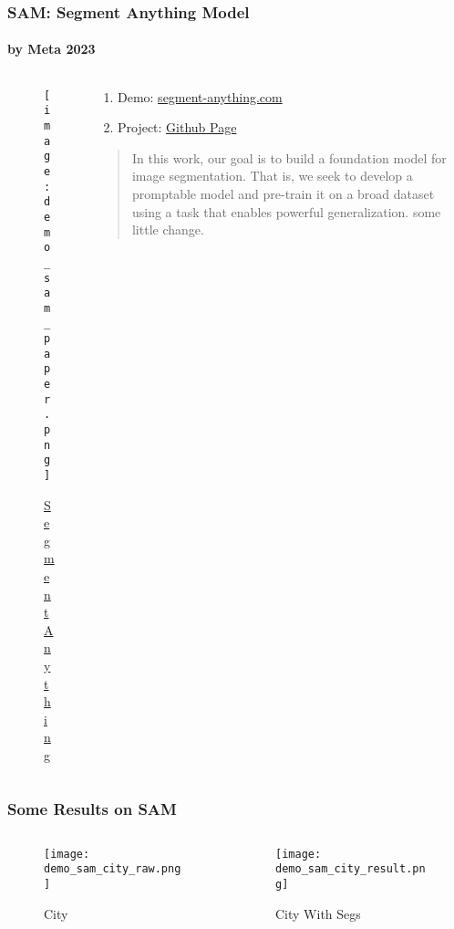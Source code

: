 \begin{frame}
    \frametitle{SAM: Segment Anything Model}
    \framesubtitle{by Meta 2023}
    \begin{columns}[c] %
        \begin{column}{0.3\textwidth} %
            \begin{figure}
                \texttt{[image: demo\_sam\_paper.png]}
                \caption{\href{https://arxiv.org/abs/2304.02643}{Segment Anything}}
            \end{figure}
        \end{column}
        \begin{column}{0.68\textwidth} %
            \begin{enumerate}
                \item Demo: \href{https://segment-anything.com/demo}{segment-anything.com}
                \item Project: \href{https://github.com/facebookresearch/segment-anything}{Github Page}
            \end{enumerate}
            \begin{quote}
                In this work, our goal is to build a foundation model for image segmentation. That is, we seek to develop a promptable model and pre-train
                it on a broad dataset using a task that enables powerful generalization. some little change.
            \end{quote}
        \end{column}
    \end{columns}
\end{frame}


\begin{frame}
    \frametitle{Some Results on SAM}
    \begin{columns}[c] %
        \begin{column}{0.48\textwidth} %
            \begin{figure}
                \texttt{[image: demo\_sam\_city\_raw.png]}
                \caption{City}
            \end{figure}
        \end{column}
        \begin{column}{0.48\textwidth} %
            \begin{figure}
                \texttt{[image: demo\_sam\_city\_result.png]}
                \caption{City With Segs}
            \end{figure}
        \end{column}
    \end{columns}
\end{frame}


